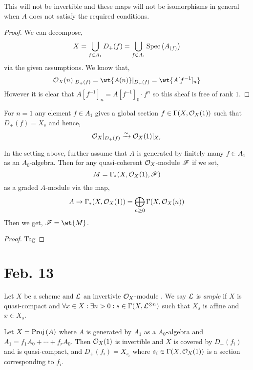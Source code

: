 \documentclass[12pt]{article}
\begin{document}
\begin{remark}
This will not be invertible and these maps will not be isomorphisms in general when $A$ does not satisfy the required conditions.
\end{remark}

\begin{proof}
We can decompose,
\[ X = \bigcup_{f \in A_1} D_{+}(f) = \bigcup_{f \in A_1}  \mathrm{Spec}\left( A_{(f)} \right) \]
via the given assumptions. We know that,
\[ \struct{X}(n) |_{D_+(f)} = \wt{A(n)} |_{D_+(f)} = \wt{A[f^{-1}]_{n}} \]
However it is clear that $A[f^{-1}]_{n} = A[f^{-1}]_{0} \cdot f^n$ so this sheaf is free of rank $1$. 
\end{proof}

\begin{remark}
For $n = 1$ any element $f \in A_1$ gives a global section $f \in \Gamma(X, \mathcal{O}_{X}(1))$ such that $D_{+}(f) = X_s$ and hence,
\[ \mathcal{O}_{X}|_{D_+(f)} \xrightarrow{\sim} \mathcal{O}_{X}(1)|_{X_s} \]\end{remark}

\begin{corollary}
In the setting above, further assume that $A$ is generated by finitely many $f \in A_1$ as an $A_0$-algebra. Then for any quasi-coherent $\mathcal{O}_{X}$-module $\mathscr{F}$ if we set,
\[ M = \Gamma_*(X, \mathcal{O}_{X}(1), \mathscr{F}) \]
as a graded $A$-module via the map,
\[ A \to \Gamma_*(X, \mathcal{O}_{X}(1)) = \bigoplus_{n \ge 0} \Gamma(X, \mathcal{O}_{X}(n)) \]
Then we get, $\F = \wt{M}$. 
\end{corollary}

\begin{proof}
Tag 
\end{proof}

\section{Feb. 13}


\begin{definition}
Let $X$ be a scheme and $\mathcal{L}$ an invertivle $\mathcal{O}_{X}$-module . We say $\mathcal{L}$ is \textit{ample} if $X$ is quasi-compact and $\forall x \in X : \exists n > 0 : s \in \Gamma(X, \mathcal{L}^{\otimes n})$ such that $X_{s}$ is affine and $x \in X_s$. 
\end{definition}

\begin{example}
Let $X = \mathrm{Proj}\left( A \right)$ where $A$ is generated by $A_1$ as a $A_0$-algebra and $A_1 = f_1 A_0 + \cdots + f_r A_0$. Then $\mathcal{O}_{X}(1)$ is invertible and $X$ is covered by $D_{+}(f_i)$ and is quasi-compact, and $D_+(f_i) = X_{s_i}$ where $s_i \in \Gamma(X, \mathcal{O}_{X}(1))$ is a section corresponding to $f_i$. 
\end{example}
\end{document}
